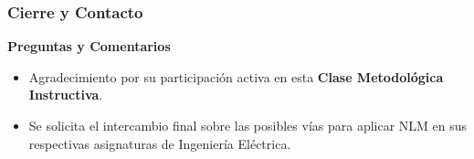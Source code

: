 \documentclass[aspectratio=43]{beamer}
\begin{document}
\begin{frame}
\frametitle{ Cierre y Contacto}
\begin{center}
\textbf{\Huge{Preguntas y Comentarios}}
\end{center}
\vfill
\begin{itemize}
    \item Agradecimiento por su participación activa en esta \textbf{Clase Metodológica Instructiva}.
    \item Se solicita el intercambio final sobre las posibles vías para aplicar NLM en sus respectivas asignaturas de Ingeniería Eléctrica.
\end{itemize}
\end{frame}
\end{document}
